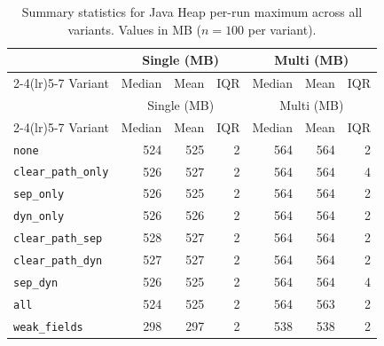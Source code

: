 \begin{longtable}[c]{l rrr rrr}
\caption[Java heap summary statistics]{Summary statistics for Java Heap per-run maximum across all variants. Values in MB ($n=100$ per variant).}\label{tab:stats-memory-java-heap} \\
\toprule
 & \multicolumn{3}{c}{Single (MB)} & \multicolumn{3}{c}{Multi (MB)} \\
\cmidrule(lr){2-4}\cmidrule(lr){5-7}
Variant & Median & Mean & IQR & Median & Mean & IQR \\
\midrule
\endfirsthead
\toprule
 & \multicolumn{3}{c}{Single (MB)} & \multicolumn{3}{c}{Multi (MB)} \\
\cmidrule(lr){2-4}\cmidrule(lr){5-7}
Variant & Median & Mean & IQR & Median & Mean & IQR \\
\midrule
\endhead
\bottomrule
\endfoot
\texttt{none} & 524 & 525 & 2 & 564 & 564 & 2 \\
\texttt{clear\_path\_only} & 526 & 527 & 2 & 564 & 564 & 4 \\
\texttt{sep\_only} & 526 & 525 & 2 & 564 & 564 & 2 \\
\texttt{dyn\_only} & 526 & 526 & 2 & 564 & 564 & 2 \\
\texttt{clear\_path\_sep} & 528 & 527 & 2 & 564 & 564 & 2 \\
\texttt{clear\_path\_dyn} & 527 & 527 & 2 & 564 & 564 & 2 \\
\texttt{sep\_dyn} & 526 & 525 & 2 & 564 & 564 & 4 \\
\texttt{all} & 524 & 525 & 2 & 564 & 563 & 2 \\
\texttt{weak\_fields} & 298 & 297 & 2 & 538 & 538 & 2 \\
\end{longtable}
